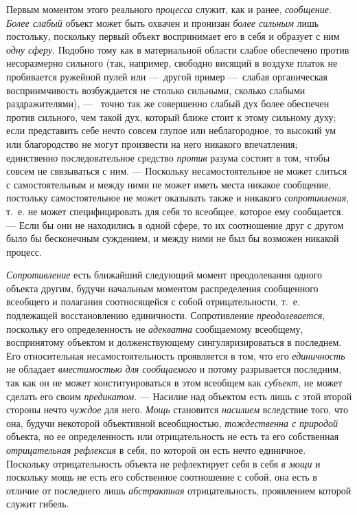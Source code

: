 \documentclass[twoside]{article}
\begin{document}
{{{{{Первым моментом этого реального
{\em процесса} служит,
как и ранее, {\em сообщение}.
{\em Более слабый} объект
может быть охвачен и пронизан {\em более
сильным} лишь постольку, поскольку первый объект
воспринимает его в себя и образует с ним
{\em одну сферу}. Подобно
тому как в материальной области слабое обеспечено против несоразмерно
сильного (так, например, свободно висящий в воздухе платок не пробивается
ружейной пулей или —~другой пример —~слабая
органическая восприимчивость возбуждается не столько сильными, сколько
слабыми раздражителями), — \ точно так же совершенно слабый
дух более обеспечен против сильного, чем такой дух, который ближе стоит к
этому сильному духу; если представить себе нечто совсем глупое или
неблагородное, то высокий ум или благородство не могут произвести на него
никакого впечатления; единственно последовательное средство
{\em против} разума
состоит в том, чтобы совсем не связываться с ним. —
Поскольку несамостоятельное не может слиться с
самостоятельным и между ними не может иметь места никакое сообщение,
постольку самостоятельное не может оказывать также и никакого
{\em сопротивления},
т.~е. не может специфицировать для себя то всеобщее, которое
ему сообщается. — Если бы они не находились в одной сфере,
то их соотношение друг с другом было бы бесконечным
суждением, и между ними не был бы возможен никакой процесс.

{\em Сопротивление} есть
ближайший следующий момент преодолевания одного объекта другим, будучи
начальным моментом распределения сообщенного всеобщего и полагания
соотносящейся с собой отрицательности, т.~е. подлежащей восстановлению
единичности. Сопротивление
{\em преодолевается},
поскольку его определенность не
{\em адекватна}
сообщаемому всеобщему, воспринятому объектом и
долженствующему сингуляризироваться в последнем. Его относительная
несамостоятельность проявляется в том, что его
{\em единичность} не
обладает {\em вместимостью для
сообщаемого} и потому разрывается последним, так как он не
может конституироваться в этом всеобщем как
{\em субъект}, не может
сделать его своим {\em предикатом}. —
Насилие над объектом есть лишь с этой второй стороны нечто
{\em чуждое} для него.
{\em Мощь} становится
{\em насилием} вследствие
того, что она, будучи некоторой объективной всеобщностью,
{\em тождественна с природой}
объекта, но ее определенность или отрицательность не есть та
его собственная {\em отрицательная
рефлексия} в себя, по которой он есть нечто единичное.
Поскольку отрицательность объекта не рефлектирует себя в себя
{\em в мощи} и поскольку
мощь не есть его собственное соотношение с собой, она есть в отличие от
последнего лишь {\em абстрактная}
отрицательность, проявлением которой служит гибель.

}}}}}
\end{document}
